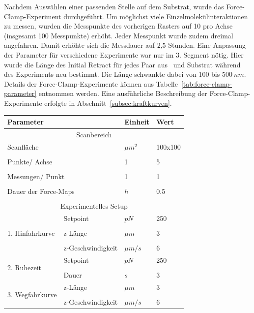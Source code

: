 Nachdem Auswählen einer passenden Stelle auf dem Substrat, wurde das Force-Clamp-Experiment durchgeführt. Um möglichst viele Einzelmolekülinteraktionen zu messen, wurden die Messpunkte des vorherigen Rasters auf 10 pro Achse (insgesamt 100 Messpunkte) erhöht. Jeder Messpunkt wurde zudem dreimal angefahren. Damit erhöhte sich die Messdauer auf 2,5 Stunden. Eine Anpassung der Parameter für verschiedene Experimente war nur im 3. Segment nötig. Hier wurde die Länge des Initial Retract für jedes Paar aus \spitze~und Substrat während des Experiments neu bestimmt. Die Länge schwankte dabei von $100$ bis $500~nm$. Details der Force-Clamp-Experimente können aus Tabelle~\ref{tab:force-clamp-parameter} entnommen werden. Eine ausführliche Beschreibung der Force-Clamp-Experimente erfolgte in Abschnitt~\ref{subsec:kraftkurven}.


\begin{table}[H]
	\centering
	\keepXColumns
	\begin{tabularx}{\textwidth}{X X X X}
		\multicolumn{2}{l}{\textbf{Parameter}}	&	\textbf{Einheit}	&	\textbf{Wert}	\\
		\toprule
		\toprule
		\multicolumn{4}{c}{Scanbereich}	\\
		\toprule
		\multicolumn{2}{l}{Scanfläche}	&	$\mu m^2$	&	100x100	\\
		&&&\\
		\multicolumn{2}{l}{Punkte/ Achse}	&	1	&	5	\\
		&&&\\
		\multicolumn{2}{l}{Messungen/ Punkt}	&	1	&	1	\\
		&&&\\
		\multicolumn{2}{l}{Dauer der Force-Maps}	&	$h$	&	0.5	\\
		&&&\\
		\toprule
		\multicolumn{4}{c}{Experimentelles Setup}	\\
		\toprule
		\multirow{5}{3cm}{1. Hinfahrkurve}	&	Setpoint	&	$pN$	&	250	\\
		&&&\\
		&	z-Länge	&	$\mu m$	&	3	\\
		&&&\\
		&	z-Geschwindigkeit	&	$\mu m/s$	&	6	\\
		\toprule
		\multirow{3}{3cm}{2. Ruhezeit}	&	Setpoint	&	$pN$	&	250	\\
		&&&\\
		&	Dauer	&	$s$	&	3	\\
		\toprule
		\multirow{3}{3cm}{3. Wegfahrkurve}	&	z-Länge	&	$\mu m$	&	3	\\
		&&&\\
		&	z-Geschwindigkeit	&	$\mu m/s$	&	6 \\
		\toprule
		\toprule
	\end{tabularx}
	\label{tab:force-ramp-parameter}
\end{table}

